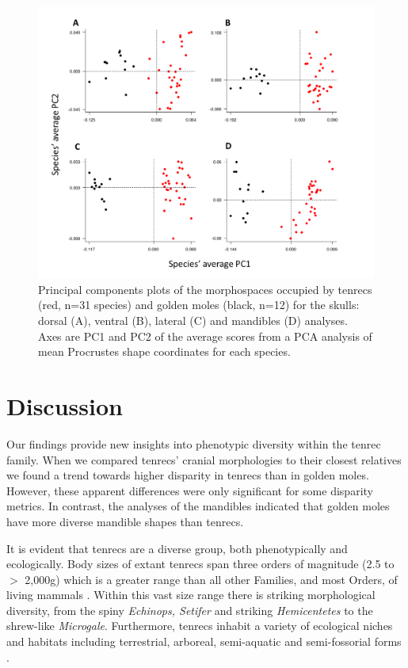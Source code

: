 \documentclass[12pt,a4paper]{article}
\begin{document}
	\begin{figure}[H]
	\centering
	\includegraphics[width=1\linewidth]{figures/FourPlotPCA.png}
	\caption{Principal components plots of the morphospaces occupied by tenrecs (red, n=31 species) and golden moles (black, n=12) for the skulls: dorsal (A), ventral (B), lateral (C) and mandibles (D) analyses. Axes are PC1 and PC2 of the average scores from a PCA analysis of mean Procrustes shape coordinates for each species. }
	\label{fig:fourPCA}
	\end{figure}


\section{Discussion} 

	Our findings provide new insights into phenotypic diversity within the tenrec family. 
	When we compared tenrecs' cranial morphologies to their closest relatives we found a trend towards higher disparity in tenrecs than in golden moles. However, these apparent differences were only significant for some disparity metrics. In contrast, the analyses of the mandibles indicated that golden moles have more diverse mandible shapes than tenrecs.



	It is evident that tenrecs are a diverse group, both phenotypically and ecologically. Body sizes of extant tenrecs span three orders of magnitude (2.5 to $>$ 2,000g) which is a greater range than all other Families, and most Orders, of living mammals \citep{Olson2003}. Within this vast size range there is striking morphological diversity, from the spiny \textit{Echinops, Setifer} and striking \textit{Hemicentetes} to the shrew-like  \textit{Microgale}. Furthermore, tenrecs inhabit a variety of ecological niches and habitats including terrestrial, arboreal, semi-aquatic and semi-fossorial forms \citep{Soarimalala2011}. 
	
\end{document}
